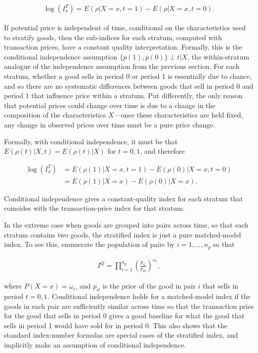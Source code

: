 \documentclass[]{article}
\begin{document}
\begin{align*}
\log(I^{T}_{x}) = E(\rho | X = x, t = 1) - E(\rho | X = x, t = 0).
\end{align*}

If potential price is independent of time, conditional on the characteristics used to stratify goods, then the sub-indices for each stratum, computed with transaction prices, have a constant quality interpretation. Formally, this is the conditional independence assumption \(\{p(1), p(0)\} \perp t | X\), the within-stratum analogue of the independence assumption from the previous section. For each stratum, whether a good sells in period 0 or period 1 is essentially due to chance, and so there are no systematic differences between goods that sell in period 0 and period 1 that influence price within a stratum. Put differently, the only reason that potential prices could change over time is due to a change in the composition of the
characteristics \(X\)---once these characteristics are held fixed, any change in observed prices over time must be a pure price change.

Formally, with conditional independence, it must be that \(E(\rho(t) | X, t) = E(\rho(t) | X)\) for \(t = 0,1\), and therefore

\begin{align*}
\log(I^{T}_{x}) &= E(\rho(1) | X = x, t = 1) - E(\rho(0) | X = x, t = 0) \\
 &= E(\rho(1) | X = x) - E(\rho(0) | X = x).
\end{align*}

Conditional independence gives a constant-quality index for each stratum that coincides with the transaction-price index for that stratum.

In the extreme case when goods are grouped into pairs across time, so that each stratum contains two goods, the stratified index is just a pure matched-model index. To see this, enumerate the population of pairs by \(i = 1,\ldots, n_{p}\) so that

\begin{align*}
I^{Q} = \prod_{i = 1}^{n_{p}} \left(\frac{p_{i1}}{p_{i0}}\right)^{\omega_{i}},
\end{align*}

where \(P(X = x) = \omega_{i}\), and \(p_{it}\) is the price of the good in pair \(i\) that sells in period \(t = 0,1\). Conditional independence holds for a matched-model index if the goods in each pair are sufficiently similar across time so that the transaction price for the good that sells in period 0 gives a good baseline for what the good that sells in period 1 would have sold for in period 0. This also shows that the standard index-number formulas are special cases of the stratified index, and implicitly make an assumption of conditional independence.
\end{document}
